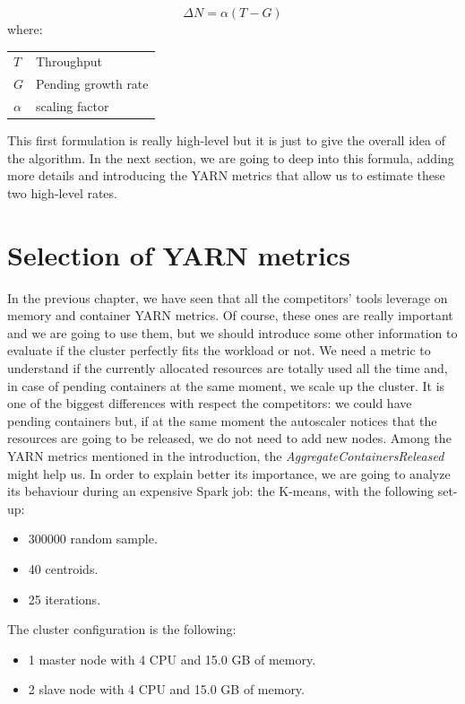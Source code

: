\documentclass[12pt,twoside,cucitura]{toptesi}
\makeatletter
\newenvironment{conditions}
  {\par\vspace{\abovedisplayskip}\noindent\begin{tabular}{>{$}l<{$} @{${}={}$} l}}
  {\end{tabular}\par\vspace{\belowdisplayskip}}
\makeatother
\begin{document}
\begin{equation} \label{eq:delta_my}
\Delta N = \alpha(T - G)
\end{equation}
where:
\begin{conditions}
 T     &  Throughput \\
G    &  Pending growth rate \\   
 \alpha & scaling factor
\end{conditions}

This first formulation is really high-level but it is just to give the overall idea of the algorithm. In the next section, we are going to deep into this formula, adding more details and introducing the YARN metrics that allow us to estimate these two high-level rates. 

\section{Selection of YARN metrics}
In the previous chapter, we have seen that all the competitors' tools leverage on memory and container YARN metrics. Of course, these ones are really important and we are going to use them, but we should introduce some other information to evaluate if the cluster perfectly fits the workload or not. We need a metric to understand if the currently allocated resources are totally used all the time and, in case of pending containers at the same moment, we scale up the cluster. It is one of the biggest differences with respect the competitors: we could have pending containers but, if at the same moment the autoscaler notices that the resources are going to be released, we do not need to add new nodes. 
Among the YARN metrics mentioned in the introduction, the \textit{AggregateContainersReleased} might help us. In order to explain better its importance, we are going to analyze its behaviour during an expensive Spark job: the K-means, with the following set-up:
\begin{itemize}
	\item 300000 random sample.
	\item 40 centroids.
	\item 25 iterations.
\end{itemize}
The cluster configuration is the following:
\begin{itemize}
	\item 1 master node with 4 CPU and 15.0 GB of memory.
	\item 2 slave node with 4 CPU and 15.0 GB of memory.
\end{itemize}
\end{document}
